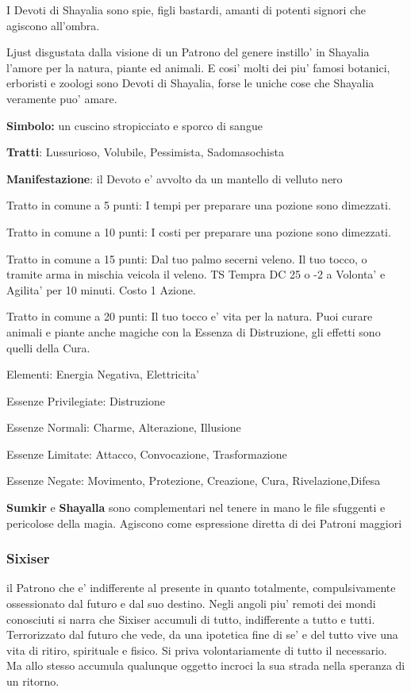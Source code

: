 \documentclass[a4paper,11pt,twoside,openany]{dndbook}
\begin{document}
{I Devoti di Shayalia sono spie, figli bastardi, amanti di potenti signori che agiscono all'ombra.

Ljust disgustata dalla visione di un Patrono del genere instillo' in Shayalia l'amore per la natura, piante ed animali. E cosi' molti dei piu' famosi botanici, erboristi e zoologi sono Devoti di Shayalia, forse le uniche cose che Shayalia veramente puo' amare.

\textbf{Simbolo:} un cuscino stropicciato e sporco di sangue

\textbf{Tratti}: Lussurioso, Volubile, Pessimista, Sadomasochista

\textbf{Manifestazione}: il Devoto e' avvolto da un mantello di velluto nero

\bigskip

Tratto in comune a 5 punti: I tempi per preparare una pozione sono dimezzati.

Tratto in comune a 10 punti: I costi per preparare una pozione sono dimezzati.

Tratto in comune a 15 punti: Dal tuo palmo secerni veleno. Il tuo tocco, o tramite arma in mischia veicola il veleno. TS Tempra DC 25 o -2 a Volonta' e Agilita' per 10 minuti. Costo 1 Azione.

Tratto in comune a 20 punti: Il tuo tocco e' vita per la natura. Puoi curare animali e piante anche magiche con la Essenza di Distruzione, gli effetti sono quelli della Cura.

\bigskip

Elementi: Energia Negativa, Elettricita'

\bigskip

Essenze Privilegiate: Distruzione

Essenze Normali: Charme, Alterazione, Illusione

Essenze Limitate: Attacco, Convocazione, Trasformazione

Essenze Negate: Movimento, Protezione, Creazione, Cura, Rivelazione,Difesa

\textbf{Sumkir} e \textbf{Shayalla} sono complementari nel tenere in mano le file sfuggenti e pericolose della magia. Agiscono come espressione diretta di dei Patroni maggiori

\subsubsection{Sixiser}

il Patrono che e' indifferente al presente in quanto totalmente, compulsivamente ossessionato dal futuro e dal suo destino. Negli angoli piu' remoti dei mondi conosciuti si narra che Sixiser accumuli di tutto, indifferente a tutto e tutti. Terrorizzato dal futuro che vede, da una ipotetica fine di se' e del tutto vive una vita di ritiro, spirituale e fisico. Si priva volontariamente di tutto il necessario. Ma allo stesso accumula qualunque oggetto incroci la sua strada nella speranza di un ritorno.

}
\end{document}
